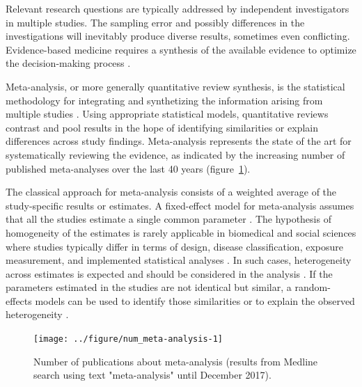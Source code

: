 \documentclass[11pt,a4paper,twoside,openany]{book}\usepackage{knitr}
\begin{document}
{Relevant research questions are typically addressed by independent investigators in multiple studies. The sampling error and possibly differences in the investigations will inevitably produce diverse results, sometimes even conflicting. Evidence-based medicine requires a synthesis of the available evidence to optimize the decision-making process \citep{haidich2010meta}. 

Meta-analysis, or more generally quantitative review synthesis, is the statistical methodology for integrating and synthetizing the information arising from multiple studies \citep{borenstein2009references}. Using appropriate statistical models, quantitative reviews contrast and pool results in the hope of identifying similarities or explain differences across study findings. Meta-analysis represents the state of the art for systematically reviewing the evidence, as indicated by the increasing number of published meta-analyses over the last 40 years (figure~\ref{fig:num_meta-analysis}).

The classical approach for meta-analysis consists of a weighted average of the study-specific results or estimates. A fixed-effect model for meta-analysis assumes that all the studies estimate a single common parameter \citep{rice2017re}. The hypothesis of homogeneity of the estimates is rarely applicable in biomedical and social sciences where studies typically differ in terms of design, disease classification, exposure measurement, and implemented statistical analyses \citep{colditz1995heterogeneity}. In such cases, heterogeneity across estimates is expected and should be considered in the analysis \citep{higgins2008commentary}. If the parameters estimated in the studies are not identical but similar, a random-effects models can be used to identify those similarities or to explain the observed heterogeneity \citep{higgins2009re}.


\begin{knitrout}\footnotesize
{}\color{fgcolor}\begin{figure}[ht!]

{\centering \texttt{[image: ../figure/num\_meta-analysis-1]} 

}

\caption[Number of publications about meta-analysis (results from Medline search using text "meta-analysis" until December 2017)]{Number of publications about meta-analysis (results from Medline search using text "meta-analysis" until December 2017).}\label{fig:num_meta-analysis}
\end{figure}



\end{knitrout}}
\end{document}

